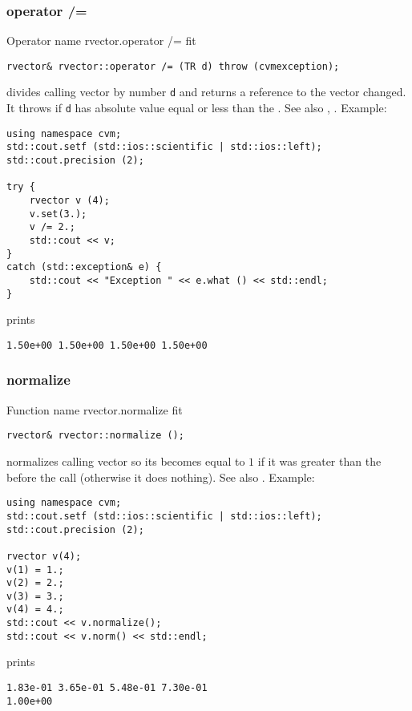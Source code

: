 \subsubsection{operator /=}
Operator%
\pdfdest name {rvector.operator /=} fit
\begin{verbatim}
rvector& rvector::operator /= (TR d) throw (cvmexception);
\end{verbatim}
divides calling vector by number \verb"d"
and returns a reference to
the vector changed.
It throws  
if \verb"d" has  absolute value equal or less
than the 
.
See also ,
.
Example:
\begin{Verbatim}
using namespace cvm;
std::cout.setf (std::ios::scientific | std::ios::left); 
std::cout.precision (2);

try {
    rvector v (4);
    v.set(3.);
    v /= 2.;
    std::cout << v;
}
catch (std::exception& e) {
    std::cout << "Exception " << e.what () << std::endl;
}
\end{Verbatim}
prints
\begin{Verbatim}
1.50e+00 1.50e+00 1.50e+00 1.50e+00
\end{Verbatim}
\newpage


\subsubsection{normalize}
Function%
\pdfdest name {rvector.normalize} fit
\begin{verbatim}
rvector& rvector::normalize ();
\end{verbatim}
normalizes calling vector so its 
becomes equal to $1$ if it was greater than the 
before the call (otherwise it does nothing).
See also .
Example:
\begin{Verbatim}
using namespace cvm;
std::cout.setf (std::ios::scientific | std::ios::left); 
std::cout.precision (2);

rvector v(4);
v(1) = 1.;
v(2) = 2.;
v(3) = 3.;
v(4) = 4.;
std::cout << v.normalize();
std::cout << v.norm() << std::endl;
\end{Verbatim}
prints
\begin{Verbatim}
1.83e-01 3.65e-01 5.48e-01 7.30e-01
1.00e+00
\end{Verbatim}
\newpage


